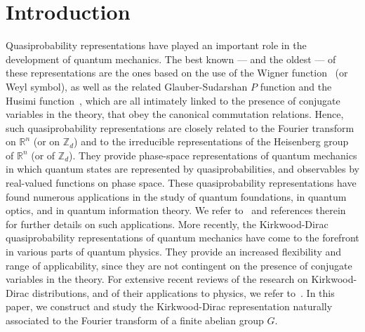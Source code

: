 \documentclass[a4paper, notitlepage, 11pt]{article}
\numberwithin{equation}{section}
\newcommand{\Z}{\mathbb{Z}}
\newcommand{\R}{\mathbb{R}}
\begin{document}
\section{Introduction}
Quasiprobability representations have played an important role in the development of quantum mechanics. The best known --- and the oldest --- of these representations are the ones based on the use of the Wigner function~\cite{wigner1932} (or Weyl symbol), as well as the related Glauber-Sudarshan $P$ function and the Husimi function~\cite{Husimi40,Sudarshan63,Glauber63}, which are all intimately linked to the presence of conjugate variables in the theory, that obey the canonical commutation relations. Hence, such quasiprobability representations are closely related to the Fourier transform on $\R^n$ (or on $\Z_{d}$) and to the irreducible representations of the Heisenberg group of $\R^n$ (or of $\Z_{d}$). They provide phase-space representations of quantum mechanics in which quantum states are represented by quasiprobabilities, and observables by real-valued functions on phase space. These quasiprobability representations have found numerous applications in the study of quantum foundations, in quantum optics, and in quantum information theory. We refer to~\cite{leonhardt,Serafini,hudson1974wigner,cohen1966,cagl69a,cagl69b,Fe11,spekkens2008} and references therein for further details on such applications.
More recently, the Kirkwood-Dirac quasiprobability representations of quantum mechanics have come to the forefront in various parts of quantum physics. They provide an increased flexibility and range of applicability, since they are not contingent on the presence of conjugate variables in the theory. For extensive recent reviews of the research on Kirkwood-Dirac distributions, and of their applications to physics, we refer to~\cite{arvidssonshukur2024properties,lostaglio2023kirkwood}. In this paper, we construct and study the Kirkwood-Dirac representation naturally associated to the Fourier transform of a finite abelian group $G$. 
\end{document}
